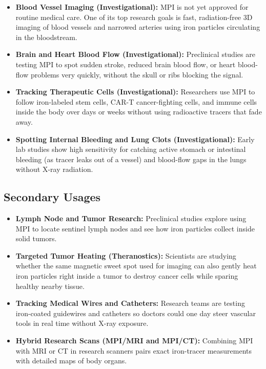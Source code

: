 \begin{itemize}
    \item \textbf{Blood Vessel Imaging (Investigational):} MPI is not yet approved for routine medical care. One of its top research goals is fast, radiation-free 3D imaging of blood vessels and narrowed arteries using iron particles circulating in the bloodstream.
    \item \textbf{Brain and Heart Blood Flow (Investigational):} Preclinical studies are testing MPI to spot sudden stroke, reduced brain blood flow, or heart blood-flow problems very quickly, without the skull or ribs blocking the signal.
    \item \textbf{Tracking Therapeutic Cells (Investigational):} Researchers use MPI to follow iron-labeled stem cells, CAR-T cancer-fighting cells, and immune cells inside the body over days or weeks without using radioactive tracers that fade away.
    \item \textbf{Spotting Internal Bleeding and Lung Clots (Investigational):} Early lab studies show high sensitivity for catching active stomach or intestinal bleeding (as tracer leaks out of a vessel) and blood-flow gaps in the lungs without X-ray radiation.
\end{itemize}

\subsection{Secondary Usages}

\begin{itemize}
    \item \textbf{Lymph Node and Tumor Research:} Preclinical studies explore using MPI to locate sentinel lymph nodes and see how iron particles collect inside solid tumors.
    \item \textbf{Targeted Tumor Heating (Theranostics):} Scientists are studying whether the same magnetic sweet spot used for imaging can also gently heat iron particles right inside a tumor to destroy cancer cells while sparing healthy nearby tissue.
    \item \textbf{Tracking Medical Wires and Catheters:} Research teams are testing iron-coated guidewires and catheters so doctors could one day steer vascular tools in real time without X-ray exposure.
    \item \textbf{Hybrid Research Scans (MPI/MRI and MPI/CT):} Combining MPI with MRI or CT in research scanners pairs exact iron-tracer measurements with detailed maps of body organs.
\end{itemize}

